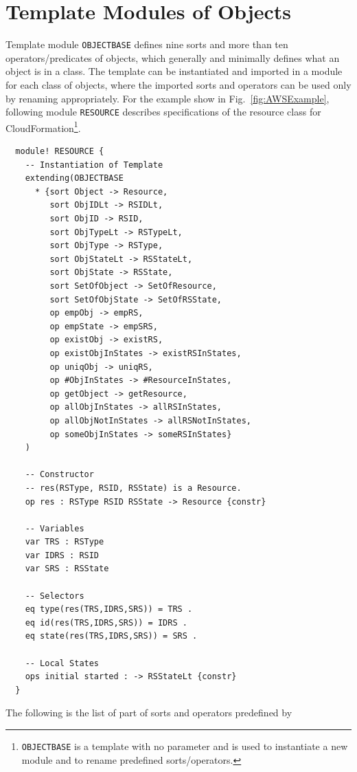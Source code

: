 \documentclass[12pt]{report}
\begin{document}
\section{Template Modules of Objects}
\label{sec:objectbase}
Template module {\tt OBJECTBASE} defines nine sorts and more than ten
operators/predicates of objects, which generally and minimally defines
what an object is in a class. The template can be instantiated and
imported in a module for each class of objects, where the imported
sorts and operators can be used only by renaming appropriately. For
the example show in Fig.~\ref{fig:AWSExample}, following module
{\tt RESOURCE} describes specifications of the resource class for
CloudFormation\footnote{{\tt OBJECTBASE} is a template with no
  parameter and is used to instantiate a new module and to rename
  predefined sorts/operators.}.
\small
\begin{verbatim}
  module! RESOURCE {
    -- Instantiation of Template
    extending(OBJECTBASE
      * {sort Object -> Resource,
         sort ObjIDLt -> RSIDLt,
         sort ObjID -> RSID,
         sort ObjTypeLt -> RSTypeLt,
         sort ObjType -> RSType,
         sort ObjStateLt -> RSStateLt,
         sort ObjState -> RSState,
         sort SetOfObject -> SetOfResource,
         sort SetOfObjState -> SetOfRSState,
         op empObj -> empRS,
         op empState -> empSRS,
         op existObj -> existRS,
         op existObjInStates -> existRSInStates,
         op uniqObj -> uniqRS,
         op #ObjInStates -> #ResourceInStates,
         op getObject -> getResource,
         op allObjInStates -> allRSInStates,
         op allObjNotInStates -> allRSNotInStates,
         op someObjInStates -> someRSInStates}
    )
  
    -- Constructor
    -- res(RSType, RSID, RSState) is a Resource.
    op res : RSType RSID RSState -> Resource {constr}
  
    -- Variables
    var TRS : RSType
    var IDRS : RSID
    var SRS : RSState
  
    -- Selectors
    eq type(res(TRS,IDRS,SRS)) = TRS .
    eq id(res(TRS,IDRS,SRS)) = IDRS .
    eq state(res(TRS,IDRS,SRS)) = SRS .
  
    -- Local States
    ops initial started : -> RSStateLt {constr}
  }
\end{verbatim}
\normalsize
The following is the list of part of sorts and operators predefined by
\end{document}
